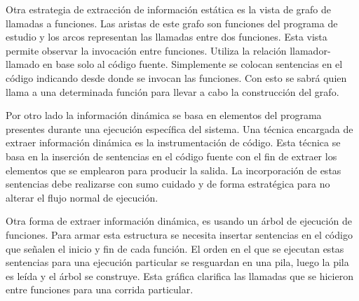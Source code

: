 \documentclass[a4paper,12pt]{report}
\begin{document}
Otra estrategia de extracción de información estática es la vista de grafo de llamadas a funciones\cite{MBPHRU10}. Las aristas de este grafo son funciones del programa de estudio y los arcos representan las llamadas entre dos funciones. Esta vista permite observar la invocación entre funciones. Utiliza la relación llamador-llamado en base solo al código fuente. Simplemente se colocan sentencias en el código indicando desde donde se invocan las funciones. Con esto se sabrá quien llama a una determinada función para llevar a cabo la construcción del grafo.



Por otro lado la información dinámica se basa en elementos del programa presentes durante una ejecución específica del sistema\cite{THBE99}. Una técnica encargada de extraer información dinámica es la instrumentación de código. Esta técnica se basa en la inserción de sentencias en el código fuente con el fin de extraer los elementos que se emplearon para producir la salida.
La incorporación de estas sentencias debe realizarse con sumo cuidado y de forma estratégica para no alterar el flujo normal de ejecución.

Otra forma de extraer información dinámica, es usando un árbol de ejecución de funciones\cite{MBPHRU10}. Para armar esta estructura se necesita insertar sentencias en el código que señalen el inicio y fin de cada función. El orden en el que se ejecutan estas sentencias para una ejecución particular se resguardan en una pila, luego la pila es leída y el árbol se construye. Esta gráfica clarifica las llamadas que se hicieron entre funciones para una corrida particular.
\end{document}
